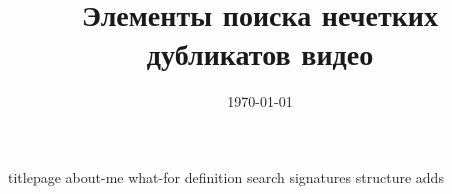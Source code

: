 \documentclass[utf8,10pt,compress,hyperref={xetex}]{beamer}
\title[\thetitlemod]{Элементы поиска нечетких дубликатов видео}
\author{\theauthormod}
\date{\today}
\begin{document}
    {titlepage}   %
    {about-me}    %
    {what-for}    %
    {definition}  %
    {search}      %
    {signatures}      %
    {structure}      %
    {adds}      %
\end{document}

